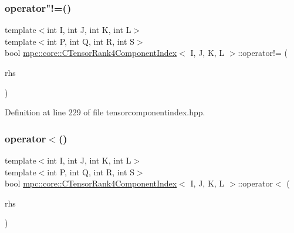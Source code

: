 \subsubsection{\texorpdfstring{operator"!=()}{operator!=()}}
{\footnotesize\ttfamily template$<$int I, int J, int K, int L$>$ \\
template$<$int P, int Q, int R, int S$>$ \\
bool \mbox{\hyperlink{classmpc_1_1core_1_1_c_tensor_rank4_component_index}{mpc\+::core\+::\+C\+Tensor\+Rank4\+Component\+Index}}$<$ I, J, K, L $>$\+::operator!= (\begin{DoxyParamCaption}\item[{const \mbox{\hyperlink{classmpc_1_1core_1_1_c_tensor_rank4_component_index}{C\+Tensor\+Rank4\+Component\+Index}}$<$ P, Q, R, S $>$ \&}]{rhs }\end{DoxyParamCaption})\hspace{0.3cm}{\ttfamily [inline]}}



Definition at line 229 of file tensorcomponentindex.\+hpp.

\mbox{\label{classmpc_1_1core_1_1_c_tensor_rank4_component_index_a97d2a6a2cc3c49e1fb4a6849d26e5c5d}} 
\subsubsection{\texorpdfstring{operator$<$()}{operator<()}}
{\footnotesize\ttfamily template$<$int I, int J, int K, int L$>$ \\
template$<$int P, int Q, int R, int S$>$ \\
bool \mbox{\hyperlink{classmpc_1_1core_1_1_c_tensor_rank4_component_index}{mpc\+::core\+::\+C\+Tensor\+Rank4\+Component\+Index}}$<$ I, J, K, L $>$\+::operator$<$ (\begin{DoxyParamCaption}\item[{const \mbox{\hyperlink{classmpc_1_1core_1_1_c_tensor_rank4_component_index}{C\+Tensor\+Rank4\+Component\+Index}}$<$ P, Q, R, S $>$ \&}]{rhs }\end{DoxyParamCaption})\hspace{0.3cm}{\ttfamily [inline]}}



